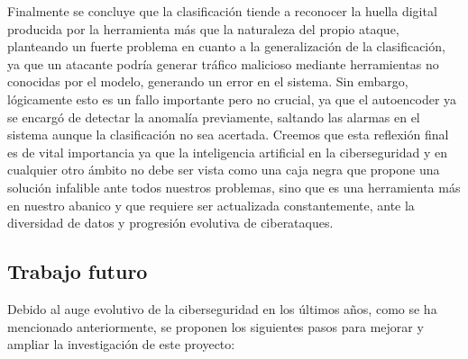 \documentclass[12pt]{article}
\numberwithin{equation}{section} %
\begin{document}
    Finalmente se concluye que la clasificación tiende a reconocer la huella digital producida por la herramienta más que la naturaleza del propio ataque, planteando un fuerte problema en cuanto a la generalización de la clasificación, ya que un atacante podría generar tráfico malicioso mediante herramientas no conocidas por el modelo, generando un error en el sistema. Sin embargo, lógicamente esto es un fallo importante pero no crucial, ya que el autoencoder ya se encargó de detectar la anomalía previamente, saltando las alarmas en el sistema aunque la clasificación no sea acertada. Creemos que esta reflexión final es de vital importancia ya que la inteligencia artificial en la ciberseguridad y en cualquier otro ámbito no debe ser vista como una caja negra que propone una solución infalible ante todos nuestros problemas, sino que es una herramienta más en nuestro abanico y que requiere ser actualizada constantemente, ante la diversidad de datos y progresión evolutiva de ciberataques.

    \vspace{10mm}

    \subsection{Trabajo futuro}

    \vspace{5mm}

    Debido al auge evolutivo de la ciberseguridad en los últimos años, como se ha mencionado anteriormente, se proponen los siguientes pasos para mejorar y ampliar la investigación de este proyecto:

    \vspace{5mm}
\end{document}
